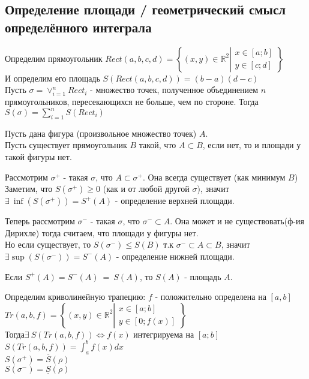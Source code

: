 \documentclass[11pt]{article}
\begin{document}
        \subsection{Определение площади / геометрический смысл определённого интеграла}
        Определим прямоугольник $Rect(a, b, c, d) = \left\{ (x, y) \in \mathbb{R}^2 \left\vert\begin{array}{l}
            x \in [a; b]\\
            y \in [c; d]
        \end{array}\right. \right\}$\\
        И определим его площадь $S(Rect(a, b, c, d)) = (b - a)(d - c)$\\
        Пусть $\sigma = \lor_{i = 1}^{n} Rect_i$ - множество точек, 
        полученное объединением $n$ прямоугольников, пересекающихся не больше, чем по стороне.
        Тогда $S(\sigma) = \sum_{i=1}^{n} S(Rect_i)$

        Пусть дана фигура (произвольное множество точек) $A$.\\
        Пусть существует прямоугольник $B$ такой, что $A \subset B$, если нет, то и площади у такой фигуры нет.

        Рассмотрим $\sigma^+$ - такая $\sigma$, что $A \subset \sigma^+$. Она всегда существует (как минимум $B$)\\
        Заметим, что $S(\sigma^+) \geq 0$ (как и от любой другой $\sigma$),
         значит $\exists\ \inf(S(\sigma^+)) = S^+(A)$ - определение верхней площади.

        Теперь рассмотрим $\sigma^-$ - такая $\sigma$, что $\sigma^- \subset A$. Она может и не существовать(ф-ия Дирихле)
         тогда считаем, что площади у фигуры нет.\\
        Но если существует, то $S(\sigma^-) \leq S(B)$ т.к $\sigma^- \subset A \subset B$, 
         значит $\exists \sup(S(\sigma^-)) = S^-(A)$ - определение нижней площади.

        Если $S^+(A) = S^-(A)\ =\ S(A)$, то $S(A)$ - площадь $A$.

        Определим криволинейную трапецию: $f$ - положительно определена на $[a, b]$\\ $Tr(a, b, f) = \left\{ (x, y) \in \mathbb{R}^2 \left\vert\begin{array}{l}
            x \in [a; b]\\
            y \in [0; f(x)]
        \end{array}\right. \right\}$\\
        Тогда\quad $\exists\ S(Tr(a, b, f)) \iff f(x)$ интегрируема на $[a; b]$\\
        $S(Tr(a, b, f)) = \int_{a}^{b} f(x)dx$\\
        $S(\sigma^+) = \overline{S}(\rho)$\\
        $S(\sigma^-) = \underline{S}(\rho)$
\end{document}
